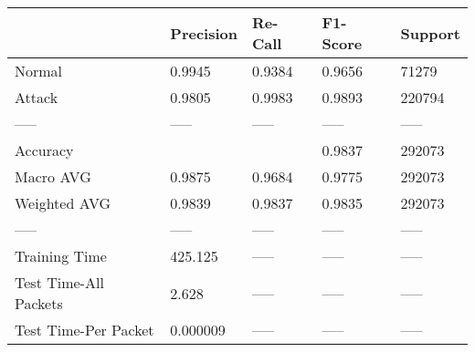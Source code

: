 \begin{tabular}{lllll}
\toprule
{} & Precision & Re-Call & F1-Score & Support \\
\midrule
Normal                &    0.9945 &  0.9384 &   0.9656 &   71279 \\
Attack                &    0.9805 &  0.9983 &   0.9893 &  220794 \\
-----                 &     ----- &   ----- &    ----- &   ----- \\
Accuracy              &           &         &   0.9837 &  292073 \\
Macro AVG             &    0.9875 &  0.9684 &   0.9775 &  292073 \\
Weighted AVG          &    0.9839 &  0.9837 &   0.9835 &  292073 \\
-----                 &     ----- &   ----- &    ----- &   ----- \\
Training Time         &   425.125 &   ----- &    ----- &   ----- \\
Test Time-All Packets &     2.628 &   ----- &    ----- &   ----- \\
Test Time-Per Packet  &  0.000009 &   ----- &    ----- &   ----- \\
\bottomrule
\end{tabular}

